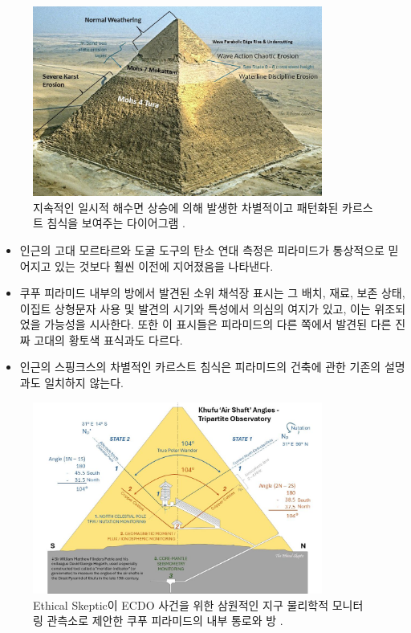 \documentclass[10pt,twocolumn,letterpaper]{article}
\begin{document}
\begin{figure}[t]
\begin{center}
\includegraphics[width=0.85\textwidth]{khafre.jpg}
\end{center}
   \caption{지속적인 일시적 해수면 상승에 의해 발생한 차별적이고 패턴화된 카르스트 침식을 보여주는 다이어그램 \cite{27}.}
\label{fig:4}
\end{figure}

\begin{flushleft}
\begin{itemize}
    \item 인근의  고대 모르타르와 도굴 도구의 탄소 연대 측정은 피라미드가 통상적으로 믿어지고 있는 것보다 훨씬 이전에 지어졌음을 나타낸다.
    \item 쿠푸 피라미드 내부의 방에서 발견된 소위 채석장 표시는 그 배치, 재료, 보존 상태, 이집트 상형문자 사용 및 발견의 시기와 특성에서 의심의 여지가 있고, 이는 위조되었을 가능성을 시사한다. 또한 이 표시들은 피라미드의 다른 
    쪽에서 발견된 다른 진짜 고대의 황토색 표식과도 다르다.
    \item 인근의 스핑크스의 차별적인 카르스트 침식은 피라미드의  건축에 관한  기존의 설명과도 일치하지 않는다.
\end{itemize}
\end{flushleft}

\begin{figure}[t]
\begin{center}
\includegraphics[width=0.85\textwidth]{shafts.jpg}
\end{center}
   \caption{Ethical Skeptic이 ECDO 사건을 위한 삼원적인 지구 물리학적 모니터링 관측소로 제안한 쿠푸 피라미드의 내부 통로와 방 \cite{28}.}
\label{fig:5}
\end{figure}
\end{document}
